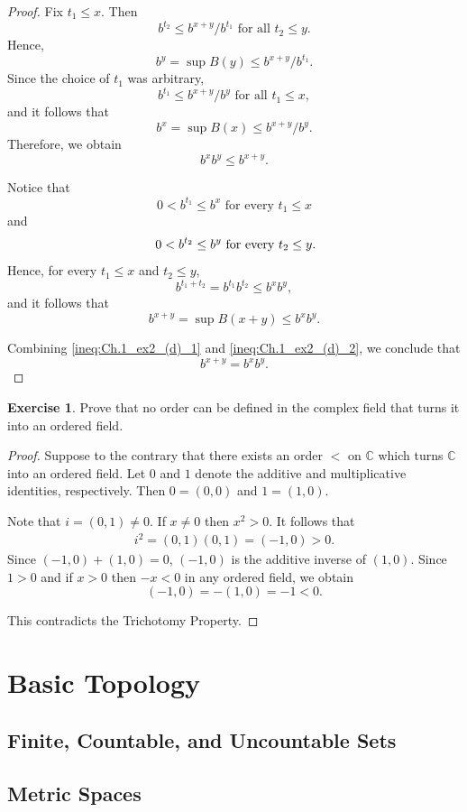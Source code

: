 \documentclass[11pt]{article}
\theoremstyle{definition}
\newtheorem{exercise}{Exercise}
\theoremstyle{plain}
\theoremstyle{remark}
\newcommand{\C}{\mathbb{C}}
\begin{document}
\begin{proof}
Fix $t_1\leq x$. Then 
\[
b^{t_2} \leq b^{x+y}/b^{t_1} \text{ for all } t_2 \leq y.
\]
Hence, 
\[
b^y = \sup B(y) \leq b^{x+y}/b^{t_1}.
\]
Since the choice of $t_1$ was arbitrary,
\[
b^{t_1} \leq b^{x+y}/b^y \text{ for all } t_1 \leq x,
\]
and it follows that
\[
b^x = \sup B(x) \leq b^{x+y}/b^y.
\]
Therefore, we obtain
\begin{equation} \label{ineq:Ch.1_ex2_(d)_1}
    b^xb^y \leq b^{x+y}.
\end{equation}

Notice that 
\[
0 < b^{t_1} \leq b^x \text{ for every } t_1 \leq x
\]
and 
\[
0 < b^{t_2} \leq b^y \text{ for every } t_2 \leq y \mathrlap{.}
\]
Hence, for every $t_1 \leq x$ and $t_2 \leq y$, 
\[
b^{t_1+t_2} = b^{t_1}b^{t_2} \leq b^xb^y,
\]
and it follows that
\begin{equation}\label{ineq:Ch.1_ex2_(d)_2}
b^{x+y} = \sup B(x+y) \leq b^xb^y.
\end{equation}

Combining \eqref{ineq:Ch.1_ex2_(d)_1} and \eqref{ineq:Ch.1_ex2_(d)_2}, we conclude that
\[
b^{x+y}=b^xb^y.
\]
\end{proof}
\begin{exercise}
Prove that no order can be defined in the complex field that turns it into an ordered field.
\end{exercise}
\begin{proof}
Suppose to the contrary that there exists an order $<$ on $\C$ which turns $\C$ into an ordered field.
Let $0$ and $1$ denote the additive and multiplicative identities, respectively. 
Then $0=(0,0)$ and $1=(1,0)$. 

Note that $i = (0,1) \neq 0$.
If $x \neq 0$ then $x^2 > 0$. 
It follows that
\begin{align*}
    i^2=(0,1)(0,1)=(-1,0)>0.
\end{align*}
Since $(-1,0)+(1,0)=0$, $(-1,0)$ is the additive inverse of $(1,0)$. 
Since $1>0$ and if $x>0$ then $-x<0$ in any ordered field, we obtain
\[
(-1,0)=-(1,0)=-1<0.
\]

This contradicts the Trichotomy Property. 
\end{proof}
\section{Basic Topology}
\subsection{Finite, Countable, and Uncountable Sets}
\subsection{Metric Spaces}
\end{document}
